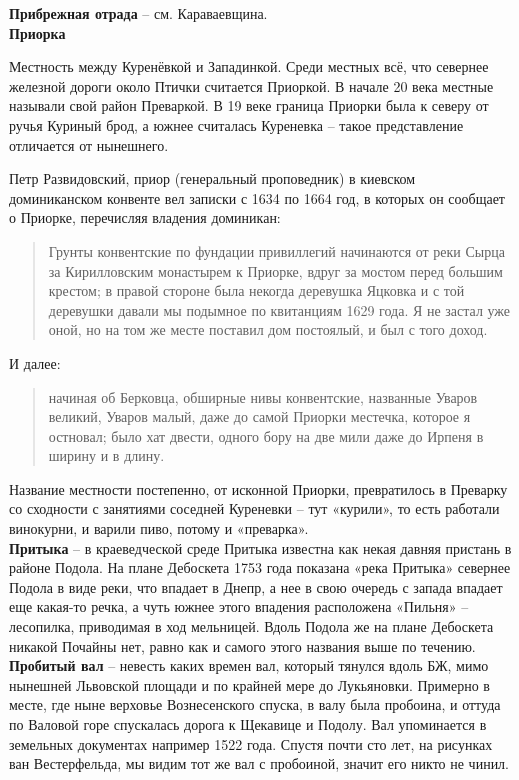 \textbf{Прибрежная отрада} – см. Караваевщина.\\

\textbf{Приорка}

Местность между Куренёвкой и Западинкой. Среди местных всё, что севернее железной дороги около Птички считается Приоркой. В начале 20 века местные называли свой район Преваркой. В 19 веке граница Приорки была к северу от ручья Куриный брод, а южнее считалась Куреневка – такое представление отличается от нынешнего. 

Петр Развидовский, приор (генеральный проповедник) в киевском доминиканском конвенте вел записки с 1634 по 1664 год, в которых он сообщает о Приорке, перечисляя владения доминикан:

\begin{quotation}
Грунты конвентские по фундации привиллегий начинаются от реки Сырца за Кирилловским монастырем к Приорке, вдруг за мостом перед большим крестом; в правой стороне была некогда деревушка Яцковка и с той деревушки давали мы подымное по квитанциям 1629 года. Я не застал уже оной, но на том же месте поставил дом постоялый, и был с того доход.
\end{quotation}

И далее:

\begin{quotation}
начиная об Берковца, обширные нивы конвентские, названные Уваров великий, Уваров малый, даже до самой Приорки местечка, которое я остновал; было хат двести, одного бору на две мили даже до Ирпеня в ширину и в длину.
\end{quotation}

Название местности постепенно, от исконной Приорки, превратилось в Преварку со сходности с занятиями соседней Куреневки – тут «курили», то есть работали винокурни, и варили пиво, потому и «преварка».\\

\textbf{Притыка} – в краеведческой среде Притыка известна как некая давняя пристань в районе Подола. На плане Дебоскета 1753 года показана «река Притыка» севернее Подола в виде реки, что впадает в Днепр, а нее в свою очередь с запада впадает еще какая-то речка, а чуть южнее этого впадения расположена «Пильня» – лесопилка, приводимая в ход мельницей. Вдоль Подола же на плане Дебоскета никакой Почайны нет, равно как и самого этого названия выше по течению.\\ 

\textbf{Пробитый вал} – невесть каких времен вал, который тянулся вдоль БЖ, мимо нынешней Львовской площади и по крайней мере до Лукьяновки. Примерно в месте, где ныне верховье Вознесенского спуска, в валу была пробоина, и оттуда по Валовой горе спускалась дорога к Щекавице и Подолу. Вал упоминается в земельных документах например 1522 года. Спустя почти сто лет, на рисунках ван Вестерфельда, мы видим тот же вал с пробоиной, значит его никто не чинил.\\ 

